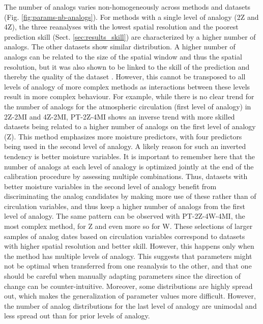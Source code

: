 \documentclass[alpha-refs]{wiley-article}
\begin{document}
The number of analogs varies non-homogeneously across methods and datasets (Fig. \ref{fig:params-nb-analogs}). For methods with a single level of analogy (2Z and 4Z), the three reanalyses with the lowest spatial resolution and the poorest prediction skill (Sect. \ref{sec:results_skill}) are characterized by a higher number of analogs. The other datasets show similar distribution. A higher number of analogs can be related to the size of the spatial window and thus the spatial resolution, but it was also shown to be linked to the skill of the prediction and thereby the quality of the dataset \citep{Horton2017b}. However, this cannot be transposed to all levels of analogy of more complex methods as interactions between these levels result in more complex behaviour. For example, while there is no clear trend for the number of analogs for the atmospheric circulation (first level of analogy) in 2Z-2MI and 4Z-2MI, PT-2Z-4MI shows an inverse trend with more skilled datasets being related to a higher number of analogs on the first level of analogy (Z). This method emphasizes more moisture predictors, with four predictors being used in the second level of analogy. A likely reason for such an inverted tendency is better moisture variables. It is important to remember here that the number of analogs at each level of analogy is optimized jointly at the end of the calibration procedure by assessing multiple combinations. Thus, datasets with better moisture variables in the second level of analogy benefit from discriminating the analog candidates by making more use of these rather than of circulation variables, and thus keep a higher number of analogs from the first level of analogy. The same pattern can be observed with PT-2Z-4W-4MI, the most complex method, for Z and even more so for W. These selections of larger samples of analog dates based on circulation variables correspond to datasets with higher spatial resolution and better skill. However, this happens only when the method has multiple levels of analogy. This suggests that parameters might not be optimal when transferred from one reanalysis to the other, and that one should be careful when manually adapting parameters since the direction of change can be counter-intuitive. Moreover, some distributions are highly spread out, which makes the generalization of parameter values more difficult. However, the number of analog distributions for the last level of analogy are unimodal and less spread out than for prior levels of analogy.
\end{document}
